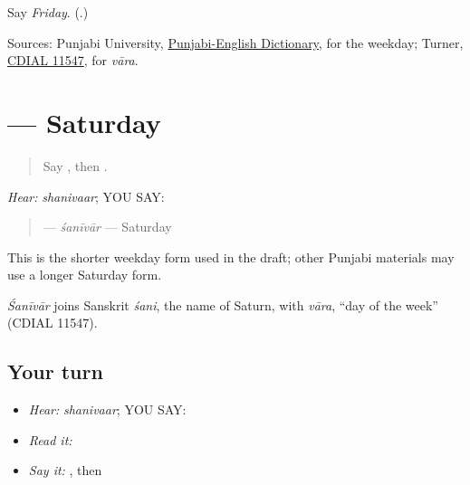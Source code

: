 \begin{tcolorbox}[breakable,colback=teal!4,colframe=teal!35!black,title={Before you move on}]
Say \emph{Friday}. (\textbf{}.)

Sources: Punjabi University, \href{https://dic.learnpunjabi.org/default.aspx?look=\%E0\%A8\%B8\%E0\%A8\%BC\%E0\%A9\%81\%E0\%A9\%B1\%E0\%A8\%95\%E0\%A8\%B0\%E0\%A8\%B5\%E0\%A8\%BE\%E0\%A8\%B0}{Punjabi-English Dictionary}, for the weekday; Turner, \href{https://dsal.uchicago.edu/dictionaries/soas/}{CDIAL 11547}, for \emph{vāra}.
\end{tcolorbox}
\section[\texorpdfstring{\pa{ਸ਼ਨੀਵਾਰ} (shanivaar)}{ਸ਼ਨੀਵਾਰ (shanivaar)}]{ — Saturday}

\label{lesson:PA-C182-shanivar}



\begin{quote}
Say \textbf{}, then \textbf{}.
\end{quote}

\begin{grammarlens}[title={Grammar Lens: one weekday by ear}]
\emph{Hear:} \emph{shanivaar}; YOU SAY: \textbf{}

\begin{quote}
\textbf{} — \emph{śanīvār} — Saturday
\end{quote}

This is the shorter weekday form used in the draft; other Punjabi materials may use a longer Saturday form.
\end{grammarlens}

\begin{cousinweb}
\emph{Śanīvār} joins Sanskrit \emph{śani}, the name of Saturn, with \emph{vāra}, \textquotedblleft{}day of the week\textquotedblright{} (CDIAL 11547).
\end{cousinweb}

\subsection*{Your turn}
\begin{itemize}
\raggedright
  \item \emph{Hear:} \emph{shanivaar}; YOU SAY: \textbf{}
  \item \emph{Read it:} \textbf{}
  \item \emph{Say it:} \textbf{}, then \textbf{}
\end{itemize}

